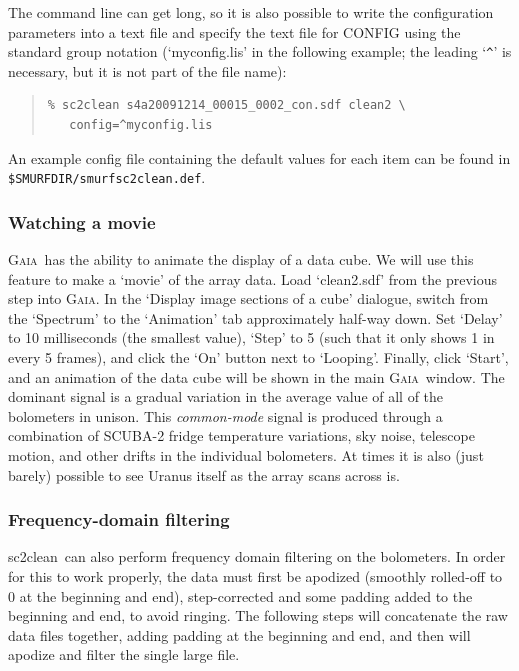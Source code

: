 \documentclass[twoside,11pt]{article}
\newcommand{\xref}[3]{#1}
\newcommand{\xlabel}[1]{}
\renewcommand{\_}{\texttt{\symbol{95}}}
\newenvironment{myquote}{\begin{quote}\begin{small}}{\end{small}\end{quote}}
\newcommand{\gaia}{\xref{\textsc{Gaia}}{sun214}{}}
\newcommand{\task}[1]{\textsf{#1}}
\newcommand{\clean}{\xref{\task{sc2clean}}{sun258}{SC2CLEAN}}
\begin{document}
The command line can get long, so it is also possible to write the
configuration parameters into a text file and specify the text file
for CONFIG using the standard group notation (`myconfig.lis' in the
following example; the leading `\verb|^|' is necessary, but it is not
part of the file name):

\begin{myquote}
\begin{verbatim}
% sc2clean s4a20091214_00015_0002_con.sdf clean2 \
   config=^myconfig.lis
\end{verbatim}
\end{myquote}

An example config file containing the default values for each item
can be found in \\ \texttt{\${SMURF\_DIR}/smurf\_sc2clean.def}.

\subsubsection{\xlabel{movie}Watching a movie}

\gaia\ has the ability to animate the display of a data cube. We will
use this feature to make a `movie' of the array data. Load
`clean2.sdf' from the previous step into \gaia. In the `Display image
sections of a cube' dialogue, switch from the `Spectrum' to the
`Animation' tab approximately half-way down.  Set `Delay' to 10
milliseconds (the smallest value), `Step' to 5 (such that it only
shows 1 in every 5 frames), and click the `On' button next to
`Looping'. Finally, click `Start', and an animation of the data cube
will be shown in the main \gaia\ window. The dominant signal is a
gradual variation in the average value of all of the bolometers in
unison. This {\em common-mode} signal is produced through a
combination of SCUBA-2 fridge temperature variations, sky noise,
telescope motion, and other drifts in the individual bolometers. At
times it is also (just barely) possible to see Uranus itself as the
array scans across is.

\subsubsection{\xlabel{fftfilter}Frequency-domain filtering}

\clean\ can also perform frequency domain filtering on the
bolometers. In order for this to work properly, the data must first be
apodized (smoothly rolled-off to 0 at the beginning and end),
step-corrected and some padding added to the beginning and end, to
avoid ringing. The following steps will concatenate the raw data files
together, adding padding at the beginning and end, and then will
apodize and filter the single large file.
\end{document}
